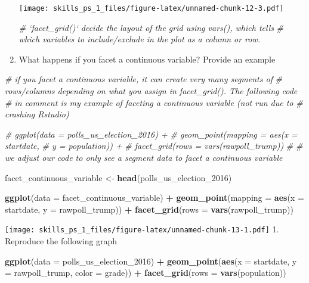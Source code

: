 \documentclass[
]{article}
\newenvironment{Shaded}{\begin{snugshade}}{\end{snugshade}}
\newcommand{\CommentTok}[1]{\textcolor[rgb]{0.56,0.35,0.01}{\textit{#1}}}
\newcommand{\DataTypeTok}[1]{\textcolor[rgb]{0.13,0.29,0.53}{#1}}
\newcommand{\DecValTok}[1]{\textcolor[rgb]{0.00,0.00,0.81}{#1}}
\newcommand{\KeywordTok}[1]{\textcolor[rgb]{0.13,0.29,0.53}{\textbf{#1}}}
\newcommand{\NormalTok}[1]{#1}
\newcommand{\OperatorTok}[1]{\textcolor[rgb]{0.81,0.36,0.00}{\textbf{#1}}}
\newcommand{\StringTok}[1]{\textcolor[rgb]{0.31,0.60,0.02}{#1}}
\begin{document}
\begin{enumerate}
  \texttt{[image: skills\_ps\_1\_files/figure-latex/unnamed-chunk-12-3.pdf]}

\begin{Shaded}
\begin{Highlighting}[]
\CommentTok{# `facet_grid()` decide the layout of the grid using vars(), which tells }
\CommentTok{# which variables to include/exclude in the plot as a column or row.}
\end{Highlighting}
\end{Shaded}
\item
  What happens if you facet a continuous variable? Provide an example
\end{enumerate}

\begin{Shaded}
\begin{Highlighting}[]
\CommentTok{# if you facet a continuous variable, it can create very many segments of }
\CommentTok{# rows/columns depending on what you assign in facet_grid(). The following code }
\CommentTok{# in comment is my example of faceting a continuous variable (not run due to }
\CommentTok{# crashing Rstudio)}

\CommentTok{#    ggplot(data = polls_us_election_2016) + }
\CommentTok{#      geom_point(mapping = aes(x = startdate, }
\CommentTok{#                               y = population)) +}
\CommentTok{#      facet_grid(rows = vars(rawpoll_trump))}
\CommentTok{#}
\CommentTok{# we adjust our code to only see a segment data to facet a continuous variable}

\NormalTok{facet_continuous_variable <-}\StringTok{ }\KeywordTok{head}\NormalTok{(polls_us_election_}\DecValTok{2016}\NormalTok{)}

    \KeywordTok{ggplot}\NormalTok{(}\DataTypeTok{data =}\NormalTok{ facet_continuous_variable) }\OperatorTok{+}\StringTok{ }
\StringTok{      }\KeywordTok{geom_point}\NormalTok{(}\DataTypeTok{mapping =} \KeywordTok{aes}\NormalTok{(}\DataTypeTok{x =}\NormalTok{ startdate, }
                               \DataTypeTok{y =}\NormalTok{ rawpoll_trump)) }\OperatorTok{+}
\StringTok{      }\KeywordTok{facet_grid}\NormalTok{(}\DataTypeTok{rows =} \KeywordTok{vars}\NormalTok{(rawpoll_trump))}
\end{Highlighting}
\end{Shaded}

\texttt{[image: skills\_ps\_1\_files/figure-latex/unnamed-chunk-13-1.pdf]}
1. Reproduce the following graph

\begin{Shaded}
\begin{Highlighting}[]
\KeywordTok{ggplot}\NormalTok{(}\DataTypeTok{data =}\NormalTok{ polls_us_election_}\DecValTok{2016}\NormalTok{) }\OperatorTok{+}
\StringTok{      }\KeywordTok{geom_point}\NormalTok{(}\KeywordTok{aes}\NormalTok{(}\DataTypeTok{x =}\NormalTok{ startdate, }
                     \DataTypeTok{y =}\NormalTok{ rawpoll_trump, }
                     \DataTypeTok{color =}\NormalTok{ grade)) }\OperatorTok{+}
\StringTok{      }\KeywordTok{facet_grid}\NormalTok{(}\DataTypeTok{rows =} \KeywordTok{vars}\NormalTok{(population))}
\end{Highlighting}
\end{Shaded}
\end{document}
